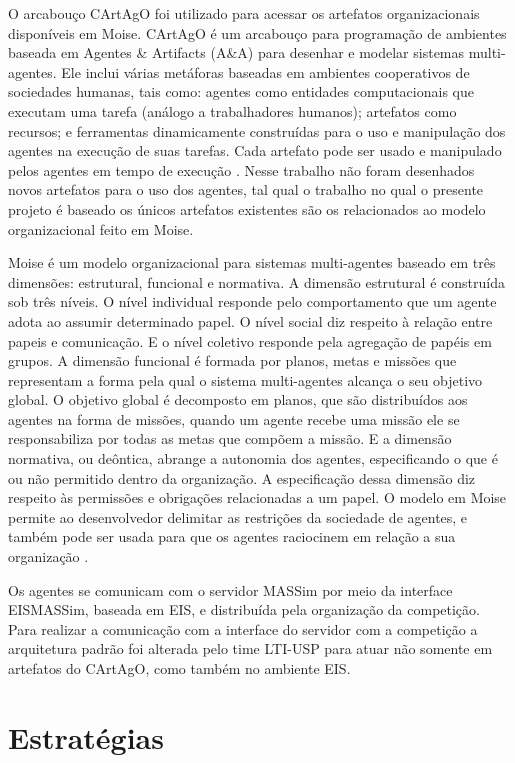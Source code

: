 \documentclass{llncs}
\begin{document}
O arcabouço CArtAgO foi utilizado para acessar os artefatos organizacionais disponíveis em Moise. CArtAgO é um arcabouço para programação de ambientes baseada em Agentes \& Artifacts (A\&A) para desenhar e modelar sistemas multi-agentes. Ele inclui várias metáforas baseadas em ambientes cooperativos de sociedades humanas, tais como: agentes como entidades computacionais que executam uma tarefa (análogo a trabalhadores humanos); artefatos como recursos; e ferramentas dinamicamente construídas para o uso e manipulação dos agentes na execução de suas tarefas. Cada artefato pode ser usado e manipulado pelos agentes em tempo de execução \cite{ricci2011cartago}. Nesse trabalho não foram desenhados novos artefatos para o uso dos agentes, tal qual o trabalho no qual o presente projeto é baseado os únicos artefatos existentes são os relacionados ao modelo organizacional feito em Moise.

Moise é um modelo organizacional para sistemas multi-agentes baseado em três dimensões: estrutural, funcional e normativa. A dimensão estrutural é construída sob três níveis. O nível individual responde pelo comportamento que um agente adota ao assumir determinado papel. O nível social diz respeito à relação entre papeis e comunicação. E o nível coletivo responde pela agregação de papéis em grupos. A dimensão funcional é formada por planos, metas e missões que representam a forma pela qual o sistema multi-agentes alcança o seu objetivo global. O objetivo global é decomposto em planos, que são distribuídos aos agentes na forma de missões, quando um agente recebe uma missão ele se responsabiliza por todas as metas que compõem a missão. E a dimensão normativa, ou deôntica, abrange a autonomia dos agentes, especificando o que é ou não permitido dentro da organização. A especificação dessa dimensão diz respeito às permissões e obrigações relacionadas a um papel. O modelo em Moise permite ao desenvolvedor delimitar as restrições da sociedade de agentes, e também pode ser usada para que os agentes raciocinem em relação a sua organização \cite{hubner2010moise}.

Os agentes se comunicam com o servidor MASSim por meio da interface EISMASSim, baseada em EIS, e distribuída pela organização da competição. Para realizar a comunicação com a interface do servidor com a competição a arquitetura padrão foi alterada pelo time LTI-USP para atuar não somente em artefatos do CArtAgO, como também no ambiente EIS.

\section{Estratégias}\label{sec:strategies}
\end{document}
